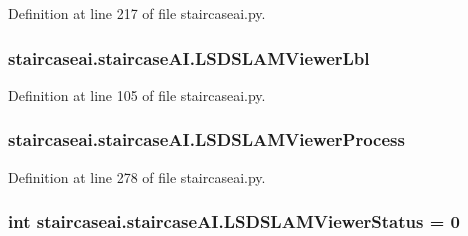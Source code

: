 Definition at line 217 of file staircaseai.\-py.

\hypertarget{classstaircaseai_1_1staircaseAI_a027e1496f0f3ecf7be88e2d3986f5bd2}{
\subsubsection[{L\-S\-D\-S\-L\-A\-M\-Viewer\-Lbl}]{\setlength{\rightskip}{0pt plus 5cm}staircaseai.\-staircase\-A\-I.\-L\-S\-D\-S\-L\-A\-M\-Viewer\-Lbl}}\label{classstaircaseai_1_1staircaseAI_a027e1496f0f3ecf7be88e2d3986f5bd2}


Definition at line 105 of file staircaseai.\-py.

\hypertarget{classstaircaseai_1_1staircaseAI_ac0e22a971bbe5e53dc1e085f7d4053b4}{
\subsubsection[{L\-S\-D\-S\-L\-A\-M\-Viewer\-Process}]{\setlength{\rightskip}{0pt plus 5cm}staircaseai.\-staircase\-A\-I.\-L\-S\-D\-S\-L\-A\-M\-Viewer\-Process}}\label{classstaircaseai_1_1staircaseAI_ac0e22a971bbe5e53dc1e085f7d4053b4}


Definition at line 278 of file staircaseai.\-py.

\hypertarget{classstaircaseai_1_1staircaseAI_a0ba4e3d2088a3c69b7afc3cdc40986c4}{
\subsubsection[{L\-S\-D\-S\-L\-A\-M\-Viewer\-Status}]{\setlength{\rightskip}{0pt plus 5cm}int staircaseai.\-staircase\-A\-I.\-L\-S\-D\-S\-L\-A\-M\-Viewer\-Status = 0\hspace{0.3cm}{\ttfamily [static]}}}\label{classstaircaseai_1_1staircaseAI_a0ba4e3d2088a3c69b7afc3cdc40986c4}


